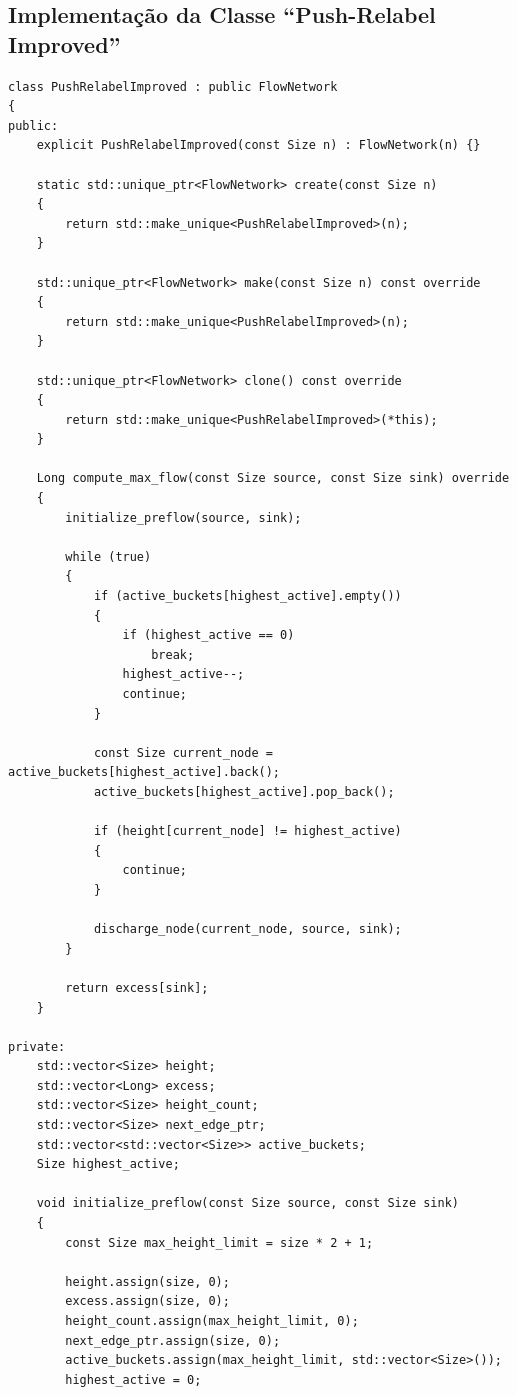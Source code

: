 \documentclass[12pt,a4paper]{article}
\begin{document}
\begin{enumerate}
\newpage
\section{Implementação da Classe ``Push-Relabel Improved''}
\label{ap:push_relabel_improved}

\begin{lstlisting}[caption={Implementação em C++ da classe \lstinline{PushRelabelImproved}, otimizada empiricamente com a Heurística de Lacuna (\textit{Gap Heuristic}).}, label={lst:push_relabel_improved}]
class PushRelabelImproved : public FlowNetwork
{
public:
	explicit PushRelabelImproved(const Size n) : FlowNetwork(n) {}

	static std::unique_ptr<FlowNetwork> create(const Size n)
	{
		return std::make_unique<PushRelabelImproved>(n);
	}

	std::unique_ptr<FlowNetwork> make(const Size n) const override
	{
		return std::make_unique<PushRelabelImproved>(n);
	}

	std::unique_ptr<FlowNetwork> clone() const override
	{
		return std::make_unique<PushRelabelImproved>(*this);
	}

	Long compute_max_flow(const Size source, const Size sink) override
	{
		initialize_preflow(source, sink);

		while (true)
		{
			if (active_buckets[highest_active].empty())
			{
				if (highest_active == 0)
					break;
				highest_active--;
				continue;
			}

			const Size current_node = active_buckets[highest_active].back();
			active_buckets[highest_active].pop_back();

			if (height[current_node] != highest_active)
			{
				continue;
			}

			discharge_node(current_node, source, sink);
		}

		return excess[sink];
	}

private:
	std::vector<Size> height;
	std::vector<Long> excess;
	std::vector<Size> height_count;
	std::vector<Size> next_edge_ptr;
	std::vector<std::vector<Size>> active_buckets;
	Size highest_active;

	void initialize_preflow(const Size source, const Size sink)
	{
		const Size max_height_limit = size * 2 + 1;

		height.assign(size, 0);
		excess.assign(size, 0);
		height_count.assign(max_height_limit, 0);
		next_edge_ptr.assign(size, 0);
		active_buckets.assign(max_height_limit, std::vector<Size>());
		highest_active = 0;


\end{lstlisting}
\end{enumerate}
\end{document}
